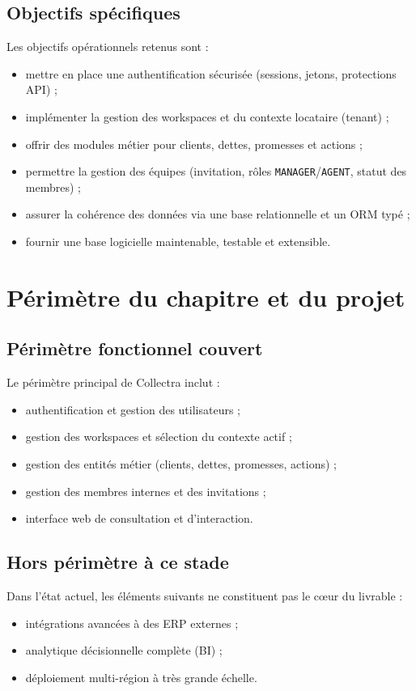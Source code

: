 \subsection{Objectifs spécifiques}
Les objectifs opérationnels retenus sont :
\begin{itemize}
  \item mettre en place une authentification sécurisée (sessions, jetons, protections API) ;
  \item implémenter la gestion des workspaces et du contexte locataire (tenant) ;
  \item offrir des modules métier pour clients, dettes, promesses et actions ;
  \item permettre la gestion des équipes (invitation, rôles \texttt{MANAGER}/\texttt{AGENT}, statut des membres) ;
  \item assurer la cohérence des données via une base relationnelle et un ORM typé ;
  \item fournir une base logicielle maintenable, testable et extensible.
\end{itemize}

\section{Périmètre du chapitre et du projet}
\subsection{Périmètre fonctionnel couvert}
Le périmètre principal de Collectra inclut :
\begin{itemize}
  \item authentification et gestion des utilisateurs ;
  \item gestion des workspaces et sélection du contexte actif ;
  \item gestion des entités métier (clients, dettes, promesses, actions) ;
  \item gestion des membres internes et des invitations ;
  \item interface web de consultation et d'interaction.
\end{itemize}

\subsection{Hors périmètre à ce stade}
Dans l'état actuel, les éléments suivants ne constituent pas le cœur du livrable :
\begin{itemize}
  \item intégrations avancées à des ERP externes ;
  \item analytique décisionnelle complète (BI) ;
  \item déploiement multi-région à très grande échelle.
\end{itemize}

